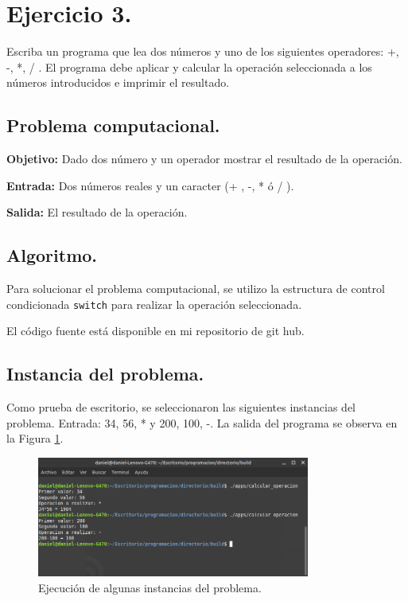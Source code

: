 \documentclass[12pt,letterpaper]{article}
\begin{document}
\section{Ejercicio 3.}

Escriba un programa que lea dos n\'umeros y uno de los siguientes operadores: +, -, *, / . El programa debe aplicar y calcular la operaci\'on seleccionada a los n\'umeros introducidos e imprimir el resultado.

\subsection{Problema computacional.}
\textbf{Objetivo:} Dado dos n\'umero y un operador mostrar el resultado de la operaci\'on.

\textbf{Entrada:} Dos n\'umeros reales y un caracter (+ , -, * \'o / ).

\textbf{Salida:} El resultado de la operaci\'on.

\subsection{Algoritmo.}
Para solucionar el problema computacional, se utilizo la estructura de control condicionada \texttt{switch} para realizar la operaci\'on seleccionada.


El código fuente está disponible en mi repositorio de git hub. \cite{url:calcular_operacion}

\subsection{Instancia del problema.}
Como prueba de escritorio, se seleccionaron las siguientes instancias del problema. Entrada: 34, 56, * y 200, 100, -. La salida del programa se observa en la Figura \ref{fig:calcular_operacion}.
\begin{figure}[ht!]
  \centering
  \includegraphics[width=0.8\textwidth]{figures/calcular_operacion}
  \caption{Ejecución de algunas instancias del problema.}
  \label{fig:calcular_operacion}
\end{figure}
\end{document}
